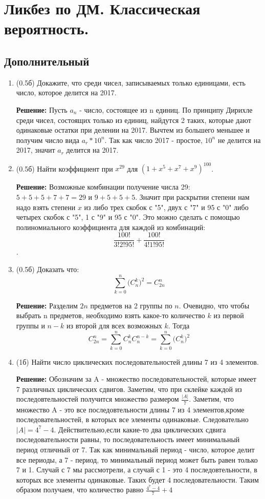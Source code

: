 \documentclass[a4paper, 14pt]{extarticle}
\begin{document}
\section{Ликбез по ДМ. Классическая вероятность.}
\subsection{Дополнительный}
\begin{enumerate}
\item (0.5б) Докажите, что среди чисел, записываемых только единицами, есть число, которое делится на 2017.

\textbf{Решение:}
Пусть $a_n$ - число, состоящее из n единиц. По принципу Дирихле среди чисел, состоящих только из единиц, найдутся 2 таких, которые дают одинаковые остатки при делении на 2017. Вычтем из большего меньшее и получим число вида $a_{r}*10^n$. Так как число 2017 - простое, $10^n$ не делится на 2017, значит $a_r$ делится на 2017.


\item (0.5б) Найти коэффициент при $x^{29}$ для $(1 + x^5 + x^7 + x^9)^{100}$.

\textbf{Решение:}
Возможные комбинации получение числа 29: 
$5+5+5+7+7 = 29$ и $9+5+5+5$. Значит при раскрытии степени нам надо взять степени $x$ из либо трех скобок с "5", двух с "7" и 95 с "0" либо четырех скобок с "5", 1 с "9" и 95 с "0". Это можно сделать с помощью полиномиального коэффициента для каждой из комбинаций: $$\frac{100!}{3!2!95!} + \frac{100!}{4!1!95!}$$.  


\item (0.5б) Доказать что:
$$\sum_{k=0}^{n} \big(C_n^k\big)^2 = C_{2n}^n$$


\textbf{Решение:}
Разделим $2n$ предметов на 2 группы по $n$. Очевидно, что чтобы выбрать n предметов, необходимо взять какое-то количество $k$ из первой группы и $n-k$ из второй для всех возможных $k$. Тогда $$C_{2n}^n = \sum_{k=0}^{n} C_n^k C_n^{n-k} = \sum_{k=0}^{n} \big(C_n^k\big)^2 $$

\addtocounter{enumi}{1}
\item (1б) Найти число циклических последовательностей длины 7 из 4 элементов.

\textbf{Решение:}
Обозначим за A - множество последовательностей, которые имеет 7 различных циклических сдвигов. Заметим, что при склейке каждой из последовтельностей получится множество размером $\frac{|A|}{7}$. Заметим, что множество A - это все последовтельности длины 7 из 4 элементов,кроме последовательностей, в которых все элементы одинаковые. Следовательно $|A| = 4^7-4$. Действительно,если какие-то два циклических сдвига последовательности равны, то последовательность имеет минимальный период отличный от 7. Так как минимальный период - число, которое делит все периоды, а 7 - период, то минимальный период может быть равен только 7 и 1. Случай с 7 мы рассмотрели, а случай с 1 - это 4 последовтельности, в которых все элементы одинаковые. Таких будет 4 последовательности. Таким образом получаем, что количество равно $\frac{4^7−4}{7} + 4$ 


\end{enumerate}
\end{document}
